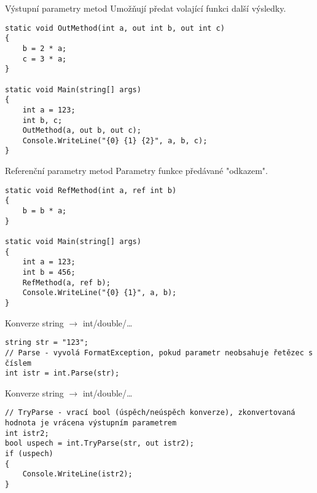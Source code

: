 \begin{frame}[fragile]
\vfill
\begin{block}{Výstupní parametry metod}
Umožňují předat volající funkci další výsledky.
\end{block}
\vfill
\begin{yesblock}
\begin{lstlisting}
static void OutMethod(int a, out int b, out int c)
{
    b = 2 * a;
    c = 3 * a;
}

static void Main(string[] args)
{
    int a = 123;
    int b, c;
    OutMethod(a, out b, out c);
    Console.WriteLine("{0} {1} {2}", a, b, c);
}
\end{lstlisting}
\end{yesblock}
\vfill
\end{frame}


\begin{frame}[fragile]
\vfill
\begin{block}{Referenční parametry metod}
Parametry funkce předávané "odkazem".
\end{block}
\vfill
\begin{yesblock}
\begin{lstlisting}
static void RefMethod(int a, ref int b)
{
    b = b * a;
}

static void Main(string[] args)
{
    int a = 123;
    int b = 456;
    RefMethod(a, ref b);
    Console.WriteLine("{0} {1}", a, b);
}
\end{lstlisting}
\end{yesblock}
\vfill
\end{frame}



\begin{frame}[fragile]
\vfill
\begin{exampleblock}{Konverze string $\rightarrow$ int/double/\ldots}
\begin{lstlisting}
string str = "123";
// Parse - vyvolá FormatException, pokud parametr neobsahuje řetězec s číslem
int istr = int.Parse(str);
\end{lstlisting}
\end{exampleblock}
\vfill
\begin{exampleblock}{Konverze string $\rightarrow$ int/double/\ldots}
\begin{lstlisting}
// TryParse - vrací bool (úspěch/neúspěch konverze), zkonvertovaná hodnota je vrácena výstupním parametrem
int istr2;
bool uspech = int.TryParse(str, out istr2);
if (uspech) 
{
    Console.WriteLine(istr2);
}
\end{lstlisting}
\end{exampleblock}
\vfill
\end{frame}


